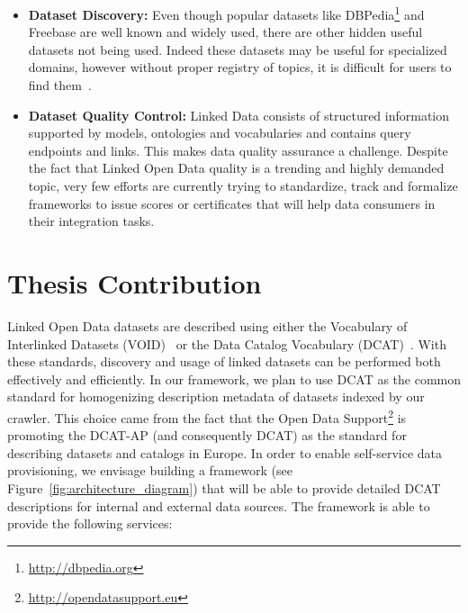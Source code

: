 \begin{itemize}
\item \textbf{Dataset Discovery:} Even though popular datasets like DBPedia\footnote{\url{http://dbpedia.org}} and Freebase are well known and widely used, there are other hidden useful datasets not being used. Indeed these datasets may be useful for specialized domains, however without proper registry of topics, it is difficult for users to find them~\cite{Lalithsena:WI:13}.
\item \textbf{Dataset Quality Control:} Linked Data consists of structured information supported by models, ontologies and vocabularies and contains query endpoints and links. This makes data quality assurance a challenge. Despite the fact that Linked Open Data quality is a trending and highly demanded topic, very few efforts are currently trying to standardize, track and formalize frameworks to issue scores or certificates that will help data consumers in their integration tasks.
\end{itemize}

\section{Thesis Contribution} \label{sec:contribution}

Linked Open Data datasets are described using either the Vocabulary of Interlinked Datasets (VOID)~\cite{Cyganiak:W3C:11} or the Data Catalog Vocabulary (DCAT)~\cite{Erickson:DCV:14}. With these standards, discovery and usage of linked datasets can be performed both effectively and efficiently. In our framework, we plan to use DCAT as the common standard for homogenizing description metadata of datasets indexed by our crawler. This choice came from the fact that the Open Data Support\footnote{\url{http://opendatasupport.eu}} is promoting the DCAT-AP (and consequently DCAT) as the standard for describing datasets and catalogs in Europe.
In order to enable self-service data provisioning, we envisage building a framework (see Figure~\ref{fig:architecture_diagram}) that will be able to provide detailed DCAT descriptions for internal and external data sources. The framework is able to provide the following services:

